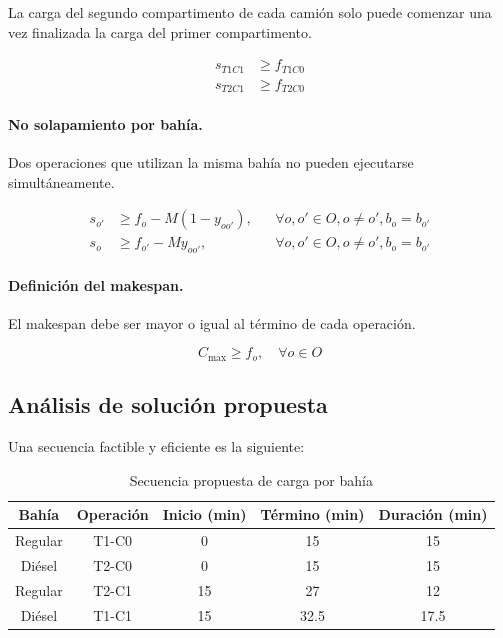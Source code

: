 La carga del segundo compartimento de cada camión solo puede comenzar una vez finalizada la carga del primer compartimento.

\begin{align}
    s_{T1C1} &\geq f_{T1C0} \\
    s_{T2C1} &\geq f_{T2C0}
\end{align}

\paragraph{No solapamiento por bahía.}

Dos operaciones que utilizan la misma bahía no pueden ejecutarse simultáneamente.

\begin{align}
    s_{o'} &\geq f_o - M(1-y_{oo'}),
    && \forall o,o' \in O, o \neq o', b_o = b_{o'} \\
    s_o &\geq f_{o'} - My_{oo'},
    && \forall o,o' \in O, o \neq o', b_o = b_{o'}
\end{align}

\paragraph{Definición del makespan.}

El makespan debe ser mayor o igual al término de cada operación.

\begin{equation}
    C_{\max} \geq f_o,
    \quad \forall o \in O
\end{equation}

\subsection{Análisis de solución propuesta}

Una secuencia factible y eficiente es la siguiente:

\begin{table}[H]
\centering
\caption{Secuencia propuesta de carga por bahía}
\begin{tabular}{ccccc}
\toprule
Bahía & Operación & Inicio (min) & Término (min) & Duración (min) \\
\midrule
Regular & T1-C0 & 0 & 15 & 15 \\
Diésel & T2-C0 & 0 & 15 & 15 \\
Regular & T2-C1 & 15 & 27 & 12 \\
Diésel & T1-C1 & 15 & 32.5 & 17.5 \\
\bottomrule
\end{tabular}
\end{table}

